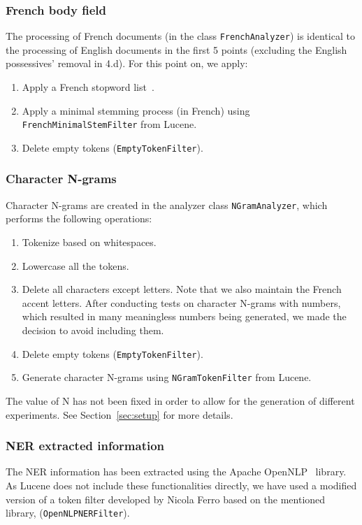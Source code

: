 \subsubsection{French body field}
The processing of French documents (in the class \texttt{FrenchAnalyzer}) is identical to the processing of English
documents in the first 5 points (excluding the English possessives' removal in 4.d).
For this point on, we apply:
\begin{enumerate}[start=6]
    \item Apply a French stopword list~\cite{stopword_french}.
    \item Apply a minimal stemming process (in French) using \texttt{FrenchMinimalStemFilter} from Lucene.
    \item Delete empty tokens (\texttt{EmptyTokenFilter}).
\end{enumerate}

\subsubsection{Character N-grams}
Character N-grams are created in the analyzer class \texttt{NGramAnalyzer}, which performs the following operations:
\begin{enumerate}
    \item Tokenize based on whitespaces.
    \item Lowercase all the tokens.
    \item Delete all characters except letters.
          Note that we also maintain the French accent letters.
          After conducting tests on character N-grams with numbers, which resulted in many meaningless numbers being generated, we made the decision to avoid including them.
    \item Delete empty tokens (\texttt{EmptyTokenFilter}).
    \item Generate character N-grams using \texttt{NGramTokenFilter} from Lucene.
\end{enumerate}
The value of N has not been fixed in order to allow for the generation of different experiments.
See Section~\ref{sec:setup} for more details.

\subsubsection{NER extracted information}
The NER information has been extracted using the Apache OpenNLP~\cite{ApacheOpenNLP} library.
As Lucene does not include these functionalities directly, we have used a modified version of a token filter developed
by Nicola Ferro based on the mentioned library, (\texttt{OpenNLPNERFilter}).\\

